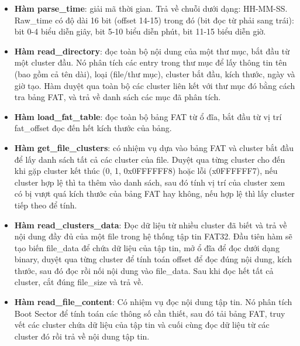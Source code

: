 \begin{itemize}
\item \textbf{Hàm parse\_time}: giải mã thời gian. Trả về chuỗi dưới dạng: HH-MM-SS. Raw\_time có độ dài 16 bit (offset 14-15) trong đó (bit đọc từ phải sang trái): bit 0-4 biểu diễn giây, bit 5-10 biểu diễn phút, bit 11-15 biểu diễn giờ.

\item \textbf{Hàm read\_directory}: đọc toàn bộ nội dung của một thư mục, bắt đầu từ một cluster đầu. Nó phân tích các entry trong thư mục để lấy thông tin tên (bao gồm cả tên dài), loại (file/thư mục), cluster bắt đầu, kích thước, ngày và giờ tạo. Hàm duyệt qua toàn bộ các cluster liên kết với thư mục đó bằng cách tra bảng FAT, và trả về danh sách các mục đã phân tích.

\item \textbf{Hàm load\_fat\_table}: đọc toàn bộ bảng FAT từ ổ đĩa, bắt đầu từ vị trí fat\_offset đọc đến hết kích thước của bảng.

\item \textbf{Hàm get\_file\_clusters}: có nhiệm vụ dựa vào bảng FAT và cluster bắt đầu để lấy danh sách tất cả các cluster của file. Duyệt qua từng cluster cho đến khi gặp cluster kết thúc (0, 1, 0x0FFFFFF8) hoặc lỗi (x0FFFFFF7), nếu cluster hợp lệ thì ta thêm vào danh sách, sau đó tính vị trí của cluster xem có bị vượt quá kích thước của bảng FAT  hay không, nếu hợp lệ thì lấy cluster tiếp theo để tính.

\item \textbf{Hàm read\_clusters\_data}: Đọc dữ liệu từ nhiều cluster đã biết và trả về nội dung đầy đủ của một file trong hệ thống tập tin FAT32. Đầu tiên hàm sẽ tạo biến file\_data để chứa dữ liệu của tập tin, mở ổ đĩa để đọc dưới dạng binary, duyệt qua từng cluster để tính toán offset để đọc đúng nội dung, kích thước, sau đó đọc rồi nối nội dung vào file\_data. Sau khi đọc hết tất cả cluster, cắt đúng file\_size và trả về.

\item \textbf{Hàm read\_file\_content}: Có nhiệm vụ đọc nội dung tập tin. Nó phân tích Boot Sector để tính toán các thông số cần thiết, sau đó tải bảng FAT, truy vết các cluster chứa dữ liệu của tập tin và cuối cùng đọc dữ liệu từ các cluster đó rồi trả về nội dung tập tin.

\end{itemize}